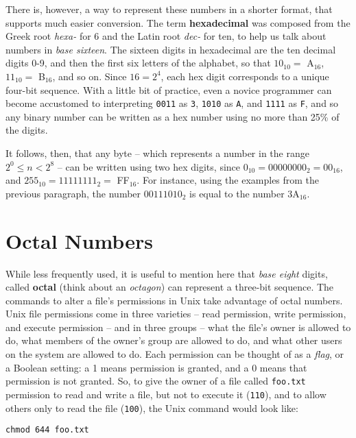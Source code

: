 There is, however, a way to represent these numbers in a shorter format, that supports much easier conversion.  The term \textbf{hexadecimal} was composed from the Greek root \textit{hexa-} for 6 and the Latin root \textit{dec-} for ten, to help us talk about numbers in \textit{base sixteen}.  The sixteen digits in hexadecimal are the ten decimal digits 0-9, and then the first six letters of the alphabet, so that $10_{10} =$ A$_{16}$, $11_{10} =$ B$_{16}$, and so on.  Since $16 = 2^4$, each hex digit corresponds to a unique four-bit sequence.  With a little bit of practice, even a novice programmer can become accustomed to interpreting \verb-0011- as \verb-3-, \verb-1010- as \verb-A-, and \verb-1111- as \verb-F-, and so any binary number can be written as a hex number using no more than 25\% of the digits.

It follows, then, that any byte -- which represents a number in the range $2^0 \le n < 2^8$ -- can be written using two hex digits, since $0_{10} = 00000000_2 = 00_{16}$, and $255_{10} = 11111111_2 = $ FF$_{16}$.  For instance, using the examples from the previous paragraph, the number $00111010_2$ is equal to the number 3A$_{16}$.

\setcounter{section}{7}
\section{Octal Numbers}

While less frequently used, it is useful to mention here that \textit{base eight} digits, called \textbf{octal} (think about an \textit{octagon}) can represent a three-bit sequence.  The commands to alter a file's permissions in Unix take advantage of octal numbers.  Unix file permissions come in three varieties -- read permission, write permission, and execute permission -- and in three groups -- what the file's owner is allowed to do, what members of the owner's group are allowed to do, and what other users on the system are allowed to do.  Each permission can be thought of as a \textit{flag}, or a Boolean setting: a 1 means permission is granted, and a 0 means that permission is not granted.  So, to give the owner of a file called \texttt{foo.txt} permission to read and write a file, but not to execute it (\texttt{110}), and to allow others only to read the file (\texttt{100}), the Unix command would look like:

\begin{center}\texttt{chmod 644 foo.txt}\end{center}

